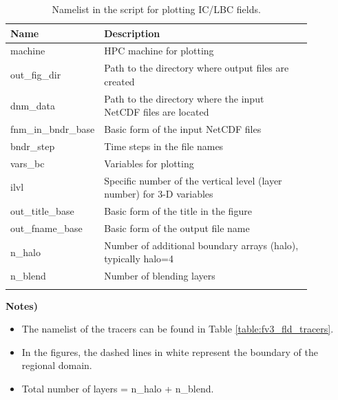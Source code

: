 \documentclass[11pt,fleqn]{report}              %
\begin{document}
{
\fontsize{10}{12}\selectfont
\begin{longtable}{p{0.17\linewidth} | p{0.7\linewidth} }
\hline
\hline
Name & Description \\
\hline
 machine & HPC machine for plotting \\
 out\_fig\_dir & Path to the directory where output files are created \\
 dnm\_data & Path to the directory where the input NetCDF files are located   \\
 fnm\_in\_bndr\_base & Basic form of the input NetCDF files \\
 bndr\_step & Time steps in the file names \\
 vars\_bc & Variables for plotting \\
 ilvl & Specific number of the vertical level (layer number) for 3-D variables \\
 out\_title\_base & Basic form of the title in the figure \\
 out\_fname\_base & Basic form of the output file name \\
 n\_halo & Number of additional boundary arrays (halo), typically halo=4 \\
 n\_blend & Number of blending layers \\
\hline
\caption{Namelist in the script for plotting IC/LBC fields.}
\label{table:fv3_var_icbc}
\end{longtable}
}

{\bf Notes)}
\begin{itemize}
\item The namelist of the tracers can be found in Table \ref{table:fv3_fld_tracers}.
\item In the figures, the dashed lines in white represent the boundary of the regional domain.
\item Total number of layers = n\_halo + n\_blend.
\end{itemize}
\end{document}
